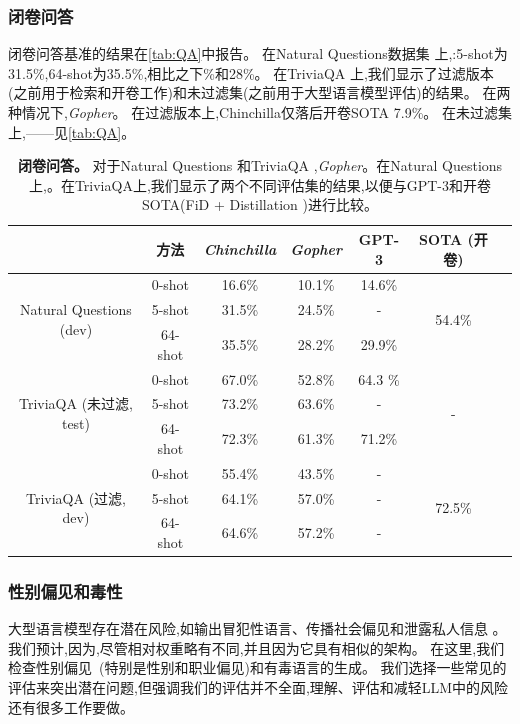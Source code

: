 \documentclass[11pt, a4paper, logo, copyright, nonumbering]{deepmind}
\newcommand{\gopher}{\textit{Gopher}\xspace}
\newcommand{\chinchilla}{\textit{Chinchilla}\xspace}
\begin{document}
\subsubsection{闭卷问答}
闭卷问答基准的结果在\autoref{tab:QA}中报告。
在Natural Questions数据集 \citep{naturalquestions}上,:5-shot为31.5\%,64-shot为35.5\%,相比之下\%和28\%。
在TriviaQA \citep{triviaqa}上,我们显示了过滤版本(之前用于检索和开卷工作)和未过滤集(之前用于大型语言模型评估)的结果。
在两种情况下,\gopher。
在过滤版本上,Chinchilla仅落后开卷SOTA \citep{izacard2020distilling} 7.9\%。
在未过滤集上,——见\autoref{tab:QA}。

\begin{table}[t]
    \centering
    \begin{tabular}{c c c c c c c}
    \toprule
    & 方法 & \chinchilla & \gopher & GPT-3 & SOTA (开卷) \\
    \midrule
    \multirow{3}{*}{Natural Questions (dev)} & 0-shot & 16.6\% &  10.1\% &  14.6\%  & \multirow{3}{*}{54.4\%} \\
    & 5-shot & 31.5\% & 24.5\% & -  & \\
    & 64-shot & 35.5\% & 28.2\% & 29.9\% &  \\
    \midrule
    \multirow{3}{*}{TriviaQA (未过滤, test)} & 0-shot & 67.0\% & 52.8\% & 64.3 \% & \multirow{3}{*}{-} \\
    & 5-shot & 73.2\% & 63.6\%  &  - &   \\
    & 64-shot & 72.3\% & 61.3\% & 71.2\% & \\
    \midrule
    \multirow{3}{*}{TriviaQA (过滤, dev)} & 0-shot & 55.4\% & 43.5\% & - & \multirow{3}{*}{72.5\%} \\
    & 5-shot &  64.1\% &  57.0\% &  - &   \\
    & 64-shot & 64.6\% & 57.2\% & - & \\
    \bottomrule
    \end{tabular}
    \caption{\textbf{闭卷问答。}
    对于Natural Questions \citep{naturalquestions}和TriviaQA \citep{triviaqa},\gopher。在Natural Questions上,。在TriviaQA上,我们显示了两个不同评估集的结果,以便与GPT-3和开卷SOTA(FiD + Distillation \citep{izacard2020distilling})进行比较。
    }
    \label{tab:QA}
\end{table}

\subsubsection{性别偏见和毒性}
大型语言模型存在潜在风险,如输出冒犯性语言、传播社会偏见和泄露私人信息 \citep{weidinger2021harms,bender2021dangers}。
我们预计,因为,尽管相对权重略有不同,并且因为它具有相似的架构。
在这里,我们检查性别偏见~(特别是性别和职业偏见)和有毒语言的生成。
我们选择一些常见的评估来突出潜在问题,但强调我们的评估并不全面,理解、评估和减轻LLM中的风险还有很多工作要做。
\end{document}
